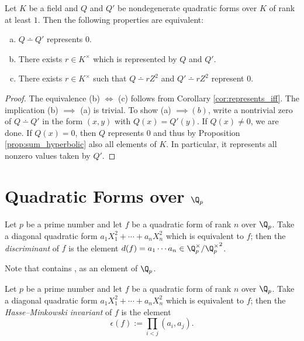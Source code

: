 \begin{corollary}\label{cor:prod_isotropic_iff}
\leanok
Let $K$ be a field and $Q$ and $Q'$ be nondegenerate quadratic forms over $K$ of rank at least $1$. Then the following properties are equivalent:
\begin{enumerate}[a)]
\item $Q \dotminus Q'$ represents $0$.
\item There exists $r \in K^\times$ which is represented by $Q$ and $Q'$.
\item There exists $r \in K^\times$ such that $Q \dotminus rZ^2$ and $Q' \dotminus rZ^2$ represent $0$.
\end{enumerate}
\end{corollary}

\begin{proof}
The equivalence (b) $\iff$ (c) follows from Corollary \ref{cor:represents_iff}. The implication (b) $\implies$ (a) is trivial. To show (a) $\implies (b)$, write a nontrivial zero of $Q \dotminus Q'$ in the form $(x, y)$ with $Q(x) = Q'(y)$. If $Q(x) \ne 0$, we are done. If $Q(x) = 0$, then $Q$ represents $0$ and thus by Proposition \ref{prop:sum_hyperbolic} also all elements of $K$. In particular, it represents all nonzero values taken by $Q'$. 
\end{proof}

\section[Quadratic Forms over the p-adics]{Quadratic Forms over $\Q_p$}\label{sec:quadratic_form_padic}

\begin{definition}\label{def:discr}
Let $p$ be a prime number and let $f$ be a quadratic form of rank $n$ over $\Q_p$. Take a diagonal quadratic form $a_1X_1^2 + \cdots + a_nX_n^2$ which is equivalent to $f$; then the \emph{discriminant} of $f$ is the element $d(f) = a_1 \cdots a_n \in \Q_p^\times/{\Q_p^\times}^2$.
	
Note that \mathlib contains , as an element of $\Q_p$.
\end{definition}

\begin{definition}\label{def:HM_inv}
\leanok
Let $p$ be a prime number and let $f$ be a quadratic form of rank $n$ over $\Q_p$. Take a diagonal quadratic form $a_1X_1^2 + \cdots + a_nX_n^2$ which is equivalent to $f$; then the \emph{Hasse--Minkowski invariant} of $f$ is the element
\[ \epsilon(f) := \prod_{i < j}(a_i, a_j).\]
\end{definition}

